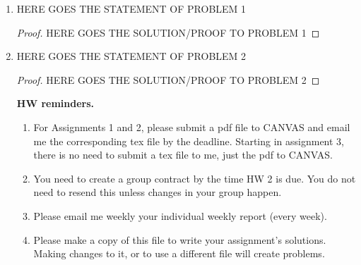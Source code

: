 \documentclass[11pt]{amsart}
\begin{document}
\begin{enumerate}
\item HERE GOES THE STATEMENT OF PROBLEM 1

\begin{proof}
HERE GOES THE SOLUTION/PROOF TO PROBLEM 1
\end{proof}

\vspace{.1in}

\item HERE GOES THE STATEMENT OF PROBLEM 2

\begin{proof}
HERE GOES THE SOLUTION/PROOF TO PROBLEM 2
\end{proof}






\vspace{1in}






\noindent \textbf{HW reminders.}
\begin{enumerate}
\item For Assignments 1 and 2, please submit a pdf file to CANVAS and email me the corresponding tex file by the deadline. Starting in assignment 3, there is no need to submit a tex file to me, just the pdf to CANVAS. 

\item You need to create a group contract by the time HW 2 is due. You do not need to resend this unless changes in your group happen.

\item Please email me weekly your individual weekly report (every week).

\item Please make a copy of this file to write your assignment's solutions. Making changes to it, or to use a different file will create problems.
\end{enumerate}
\end{enumerate}








\newpage
\end{document}

